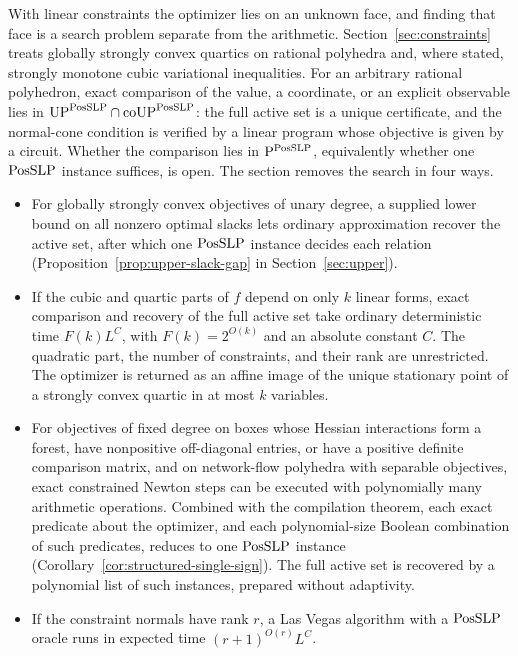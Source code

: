 With linear constraints the optimizer lies on an unknown face, and finding
that face is a search problem separate from the arithmetic.
Section~\ref{sec:constraints} treats globally strongly convex quartics on
rational polyhedra and, where stated, strongly monotone cubic variational
inequalities. For an arbitrary rational polyhedron, exact comparison of the
value, a coordinate, or an explicit observable lies in
$\mathrm{UP}^{\mathrm{PosSLP}}\cap\mathrm{coUP}^{\mathrm{PosSLP}}$: the full active set is
a unique certificate, and the normal-cone condition is verified by a linear
program whose objective is given by a circuit. Whether the comparison lies in
$\mathrm P^{\mathrm{PosSLP}}$, equivalently whether one $\mathrm{PosSLP}$ instance suffices, is
open. The section removes the search in four ways.
\begin{itemize}
\item For globally strongly convex objectives of unary degree, a supplied
  lower bound on all nonzero optimal slacks lets ordinary approximation
  recover the active set, after which one $\mathrm{PosSLP}$ instance decides each
  relation (Proposition~\ref{prop:upper-slack-gap} in
  Section~\ref{sec:upper}).
\item If the cubic and quartic parts of $f$ depend on only $k$ linear forms,
  exact comparison and recovery of the full active set take ordinary
  deterministic time $F(k)L^C$, with $F(k)=2^{O(k)}$ and an absolute constant
  $C$. The quadratic part, the number of constraints, and their rank are
  unrestricted. The optimizer is returned as an affine image of the unique
  stationary point of a strongly convex quartic in at most $k$ variables.
\item For objectives of fixed degree on boxes whose Hessian interactions form
  a forest, have nonpositive off-diagonal entries, or have a positive
  definite comparison matrix, and on network-flow polyhedra with separable
  objectives, exact constrained Newton steps can be executed with
  polynomially many arithmetic operations. Combined with the compilation
  theorem, each exact predicate about the optimizer, and each polynomial-size
  Boolean combination of such predicates, reduces to one $\mathrm{PosSLP}$ instance
  (Corollary~\ref{cor:structured-single-sign}). The full active set is
  recovered by a polynomial list of such instances, prepared without
  adaptivity.
\item If the constraint normals have rank $r$, a Las Vegas algorithm with a
  $\mathrm{PosSLP}$ oracle runs in expected time $(r+1)^{O(r)}L^C$.
\end{itemize}

